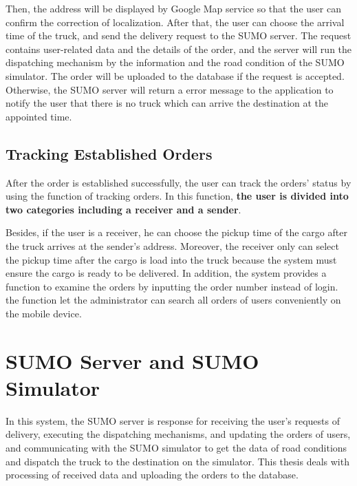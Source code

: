 \documentclass[12pt]{ksthesis}
\begin{document}
\begin{thesis}
{Then, the address will be displayed by Google Map service so that the user can confirm the correction of localization. After that, the user can choose the arrival time of the truck, and send the delivery request to the SUMO server. The request contains user-related data and the details of the order, and the server will run the dispatching mechanism by the information and the road condition of the SUMO simulator. The order will be uploaded to the database if the request is accepted. Otherwise, the SUMO server will return a error message to the application to notify the user that there is no truck which can arrive the destination at the appointed time.

\subsection{Tracking Established Orders}
After the order is established successfully, the user can track the orders’ status by using the function of tracking orders. In this function, \textbf{the user is divided into two categories including a receiver and a sender}.

Besides, if the user is a receiver, he can choose the pickup time of the cargo after the truck arrives at the sender’s address.  
Moreover, the receiver only can select the pickup time after the cargo is load into the truck because the system must ensure the cargo is ready to be delivered. 
In addition, the system provides a function to examine the orders by inputting the order number instead of login. the function let the administrator can search all orders of users conveniently on the mobile device.

\section{SUMO Server and SUMO Simulator}
In this system, the SUMO server is response for receiving the user’s requests of delivery, executing the dispatching mechanisms, and updating the orders of users, and communicating with the SUMO simulator to get the data of road conditions and dispatch the truck to the destination on the simulator. This thesis deals with processing of received data and uploading the orders to the database.

}
\end{thesis}
\end{document}
